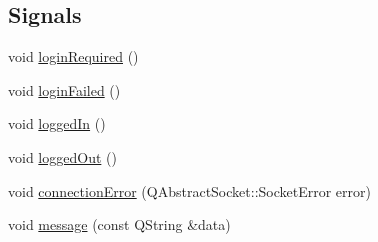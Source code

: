 \subsection*{Signals}
\begin{DoxyCompactItemize}
\item 
void \hyperlink{classQtTelnet_a1f5c31b8928e740ac09d7c6c307b4451}{loginRequired} ()
\item 
void \hyperlink{classQtTelnet_a1181936a48b5857f464e8d49586ef5f3}{loginFailed} ()
\item 
void \hyperlink{classQtTelnet_a5734a75c3d87d91db8fa069e74d29458}{loggedIn} ()
\item 
void \hyperlink{classQtTelnet_aafd4782b3e8e45850bf063a1087ab908}{loggedOut} ()
\item 
void \hyperlink{classQtTelnet_ab6e03a94fcb63d1393dfb7edda5c8a03}{connectionError} (QAbstractSocket::SocketError error)
\item 
void \hyperlink{classQtTelnet_affc0f7c1666a379e18ff11bdc09f90d8}{message} (const QString \&data)
\end{DoxyCompactItemize}
